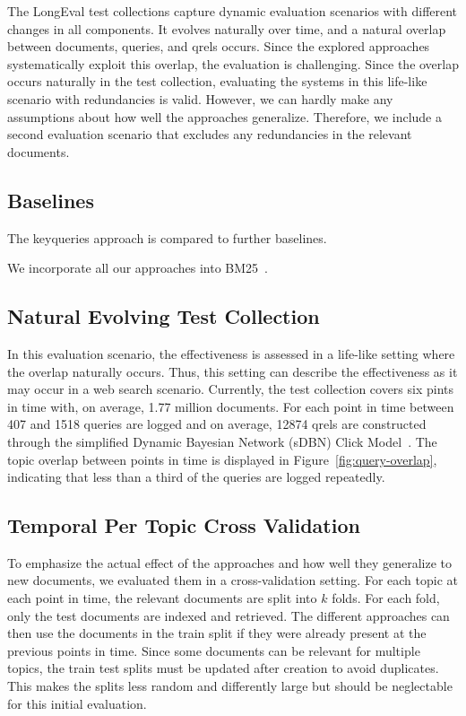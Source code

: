 




The LongEval test collections capture dynamic evaluation scenarios with different changes in all components. It evolves naturally over time, and a natural overlap between documents, queries, and qrels occurs. Since the explored approaches systematically exploit this overlap, the evaluation is challenging. Since the overlap occurs naturally in the test collection, evaluating the systems in this life-like scenario with redundancies is valid. However, we can hardly make any assumptions about how well the approaches generalize. Therefore, we include a second evaluation scenario that excludes any redundancies in the relevant documents.

  
\subsection{Baselines}
The keyqueries approach is compared to further baselines. 

We incorporate all our approaches into BM25~\cite{robertson:1994}.


\subsection{Natural Evolving Test Collection}
In this evaluation scenario, the effectiveness is assessed in a life-like setting where the overlap naturally occurs. Thus, this setting can describe the effectiveness as it may occur in a web search scenario. Currently, the test collection covers six pints in time with, on average, 1.77 million documents. For each point in time between 407 and 1518 queries are logged and on average, 12874 qrels are constructed through the simplified Dynamic Bayesian Network (sDBN) Click Model~\cite{chapelle:2009}. The topic overlap between points in time is displayed in Figure~\ref{fig:query-overlap}, indicating that less than a third of the queries are logged repeatedly.



\subsection{Temporal Per Topic Cross Validation}
To emphasize the actual effect of the approaches and how well they generalize to new documents, we evaluated them in a cross-validation setting. For each topic at each point in time, the relevant documents are split into $k$ folds. For each fold, only the test documents are indexed and retrieved. The different approaches can then use the documents in the train split if they were already present at the previous points in time. Since some documents can be relevant for multiple topics, the train test splits must be updated after creation to avoid duplicates. This makes the splits less random and differently large but should be neglectable for this initial evaluation.



